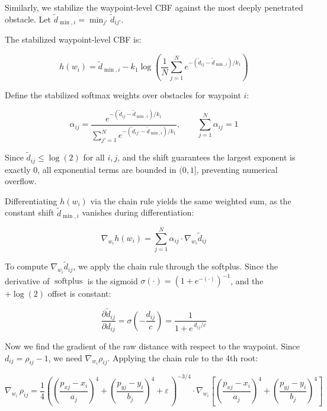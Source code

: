 \documentclass{article}
\newcommand{\softplus}{\operatorname{softplus}}
\newcommand{\sigmoid}{\sigma}
\begin{document}
Similarly, we stabilize the waypoint-level CBF against the most deeply penetrated obstacle. Let $\tilde{d}_{\min, i} = \min_{j'} \tilde{d}_{ij'}$.

The stabilized waypoint-level CBF is:

\begin{equation}
    h(w_i)
    = \tilde{d}_{\min, i} - k_1 \log \left( \frac{1}{N}\sum_{j=1}^{N} e^{-(\tilde{d}_{ij} - \tilde{d}_{\min, i})/k_1} \right)
\end{equation}

Define the stabilized softmax weights over obstacles for waypoint $i$:

\begin{equation}
    \alpha_{ij}
    = \frac{e^{-(\tilde{d}_{ij} - \tilde{d}_{\min, i})/k_1}}{\displaystyle\sum_{j'=1}^{N}
      e^{-(\tilde{d}_{ij'} - \tilde{d}_{\min, i})/k_1}},
    \qquad \sum_{j=1}^{N} \alpha_{ij} = 1
\end{equation}

Since $\tilde{d}_{ij} \leq \log(2)$ for all $i,j$, and the shift guarantees the largest exponent is exactly $0$, all exponential terms are bounded in $(0, 1]$, preventing numerical overflow.

Differentiating $h(w_i)$ via the chain rule yields the same weighted sum, as the constant shift $\tilde{d}_{\min, i}$ vanishes during differentiation:

\begin{equation}
    \nabla_{w_i} h(w_i)
    = \sum_{j=1}^{N} \alpha_{ij} \cdot \nabla_{w_i} \tilde{d}_{ij}
\end{equation}

To compute $\nabla_{w_i} \tilde{d}_{ij}$, we apply the chain rule through
the softplus. Since the derivative of $\softplus$ is the sigmoid
$\sigmoid(\cdot) = (1 + e^{-(\cdot)})^{-1}$, and the $+\log(2)$ offset is constant:

\begin{equation}
    \frac{\partial \tilde{d}_{ij}}{\partial d_{ij}}
    = \sigmoid\!\left(-\frac{d_{ij}}{c}\right)
    = \frac{1}{1 + e^{\,d_{ij}/c}}
\end{equation}

Now we find the gradient of the raw distance with respect to the waypoint. Since
$d_{ij} = \rho_{ij} - 1$, we need $\nabla_{w_i} \rho_{ij}$. Applying the chain rule to the 4th root:

\begin{equation}
    \nabla_{w_i}\, \rho_{ij}
    = \frac{1}{4} \left( \left(\frac{p_{xj} - x_i}{a_j}\right)^4 + \left(\frac{p_{yj} - y_i}{b_j}\right)^4 + \varepsilon\, \right)^{-3/4} \cdot \nabla_{w_i} \left[ \left(\frac{p_{xj} - x_i}{a_j}\right)^4 + \left(\frac{p_{yj} - y_i}{b_j}\right)^4 \right]
\end{equation}
\end{document}
